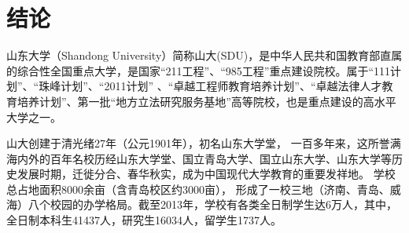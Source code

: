 


\chapter*{结\quad 论}

山东大学（Shandong University）简称山大(SDU)，是中华人民共和国教育部直属的综合性全国重点大学，是国家“211工程”、“985工程”重点建设院校。属于“111计划”、“珠峰计划”、“2011计划”  、“卓越工程师教育培养计划”、“卓越法律人才教育培养计划”、第一批“地方立法研究服务基地”高等院校，也是重点建设的高水平大学之一。


山大创建于清光绪27年（公元1901年），初名山东大学堂， 一百多年来，这所誉满海内外的百年名校历经山东大学堂、国立青岛大学、国立山东大学、山东大学等历史发展时期，迁徙分合、春华秋实，成为中国现代大学教育的重要发祥地。 学校总占地面积8000余亩（含青岛校区约3000亩）， 形成了一校三地（济南、青岛、威海）八个校园的办学格局。截至2013年，学校有各类全日制学生达6万人，其中，全日制本科生41437人，研究生16034人，留学生1737人。
